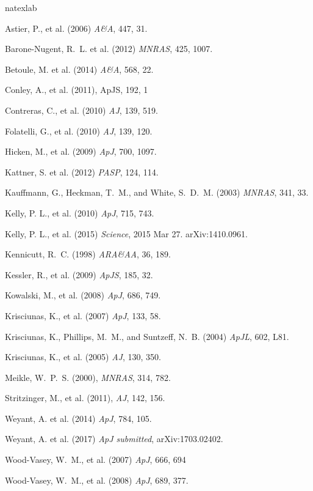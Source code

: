 \documentclass[11pt]{article}
\begin{document}
\clearpage
\begin{thebibliography}{11}
\expandafter\ifx\csname natexlab\endcsname\relax\def\natexlab#1{#1}\fi

{Astier}, P., et al. (2006) {\it A\&A}, 447, 31.

{Barone-Nugent}, R.~L. et al. (2012) {\it MNRAS}, 425, 1007.

{Betoule}, M. et al. (2014) {\it A\&A}, 568, 22.

{Conley}, A., et al. (2011), ApJS, 192, 1

{Contreras}, C., et al. (2010) {\it AJ}, 139, 519.

{Folatelli}, G., et al. (2010) {\it AJ}, 139, 120.

{Hicken}, M., et al. (2009) {\it ApJ}, 700, 1097.

{Kattner}, S. et al. (2012) {\it PASP}, 124, 114.

{Kauffmann}, G., {Heckman}, T.~M., and White, S.~D.~M. (2003) {\it MNRAS}, 341, 33.

{Kelly}, P. L., et al. (2010) {\it ApJ}, 715, 743.

{Kelly}, P. L., et al. (2015) {\it Science}, 2015 Mar 27. arXiv:1410.0961.

{Kennicutt}, R.~C. (1998) {\it ARA\&AA}, 36, 189.

{Kessler}, R., et al. (2009) {\it ApJS}, 185, 32.

{Kowalski}, M., et al. (2008) {\it ApJ}, 686, 749.

{Krisciunas}, K., et al. (2007) {\it ApJ}, 133, 58.

{Krisciunas}, K., {Phillips}, M.~M., and {Suntzeff}, N.~B. (2004) {\it ApJL}, 602, L81.

{Krisciunas}, K., et al. (2005) {\it AJ}, 130, 350.

{Meikle}, W.~P.~S. (2000), {\it MNRAS}, 314, 782.

{Stritzinger}, M., et al. (2011), {\it AJ}, 142, 156.

Weyant, A. et al. (2014) {\it ApJ}, 784, 105.

Weyant, A. et al. (2017) {\it ApJ submitted}, arXiv:1703.02402.

{Wood-Vasey}, W.~M., et al. (2007) {\it ApJ}, 666, 694

Wood-Vasey, W.~M., et al. (2008) {\it ApJ}, 689, 377.



\end{thebibliography}
\end{document}
